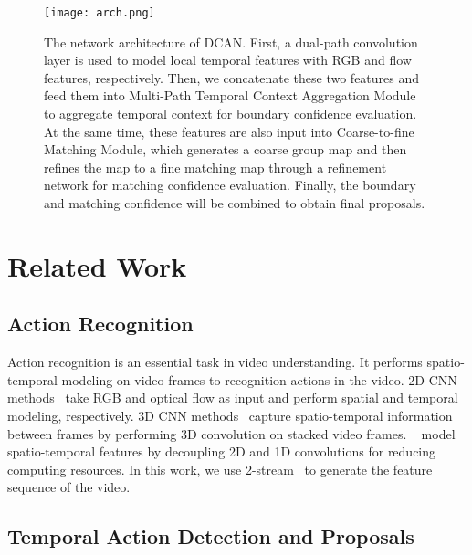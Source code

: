 \documentclass[letterpaper]{article} \usepackage{aaai22}  \usepackage{times}  \usepackage{helvet}  \usepackage{courier}  \usepackage[hyphens]{url}  \usepackage{graphicx} \urlstyle{rm} \def\UrlFont{\rm}  \usepackage{natbib}  \usepackage{caption} \DeclareCaptionStyle{ruled}{labelfont=normalfont,labelsep=colon,strut=off} \frenchspacing  \setlength{\pdfpagewidth}{8.5in}  \setlength{\pdfpageheight}{11in}  \usepackage{algorithm}
\begin{document}
\begin{figure*}[ht]
  \centering
  \texttt{[image: arch.png]}
  \caption{The network architecture of DCAN. First, a dual-path convolution layer is used to model local temporal features with RGB and flow features, respectively. Then, we concatenate these two features and feed them into Multi-Path Temporal Context Aggregation Module to aggregate temporal context for boundary confidence evaluation. At the same time, these features are also input into Coarse-to-fine Matching Module, which generates a coarse group map and then refines the map to a fine matching map through a refinement network for matching confidence evaluation. Finally, the boundary and matching confidence will be combined to obtain final proposals.\\}
  \label{fig:arch}
\end{figure*}

\section{Related Work}





\subsection{Action Recognition}
Action recognition is an essential task in video understanding. It performs spatio-temporal modeling on video frames to recognition actions in the video. 2D CNN methods~\cite{two-stream,tsn,tsm,slowfast,teinet,tea,tdn} take RGB and optical flow as input and perform spatial and temporal modeling, respectively. 3D CNN methods~\cite{c3d,r3d,i3d,t3d} capture spatio-temporal information between frames by performing 3D convolution on stacked video frames. ~\cite{p3d,s3d,r2+1d} model spatio-temporal features by decoupling 2D and 1D convolutions for reducing computing resources. In this work, we use 2-stream~\cite{two-stream} to generate the feature sequence of the video.

\subsection{Temporal Action Detection and Proposals}
\end{document}
